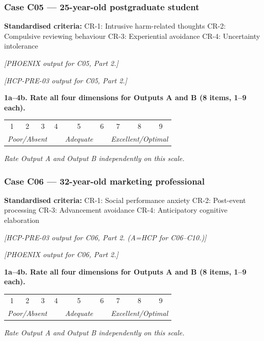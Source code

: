 \documentclass[11pt,a4paper]{article}
\makeatletter
\newcommand{\likertscale}[1]{%
\par\vspace{0.15em}%
\noindent\begin{tcolorbox}[colback=ScaleBG,colframe=BorderGrey,boxrule=0.4pt,arc=1mm,left=5pt,right=5pt,top=4pt,bottom=4pt]%
\small\textbf{\color{SlateMid}#1}\\[0.25em]%
\begin{tabular}{@{}*{9}{c}@{}}%
1 & 2 & 3 & 4 & 5 & 6 & 7 & 8 & 9 \\%
\multicolumn{3}{l}{\tiny\itshape Poor/Absent} & & \multicolumn{1}{c}{\tiny\itshape Adequate} & & \multicolumn{3}{r}{\tiny\itshape Excellent/Optimal}%
\end{tabular}%
\quad\textit{Rate Output A and Output B independently on this scale.}%
\end{tcolorbox}\vspace{0.1em}}
\makeatother
\begin{document}
\subsubsection*{Case C05 --- 25-year-old postgraduate student}
\begin{vignettebox}
\small\textbf{Standardised criteria:} CR-1: Intrusive harm-related thoughts \quad CR-2: Compulsive reviewing behaviour \quad CR-3: Experiential avoidance \quad CR-4: Uncertainty intolerance
\end{vignettebox}
\begin{outputAbox}\small\textit{[PHOENIX output for C05, Part 2.]}\end{outputAbox}
\begin{outputBbox}\small\textit{[HCP-PRE-03 output for C05, Part 2.]}\end{outputBbox}
\begin{ratingbox}
\likertscale{1a--4b. Rate all four dimensions for Outputs A and B (8 items, 1--9 each).}
\end{ratingbox}

\vspace{0.4em}

\subsubsection*{Case C06 --- 32-year-old marketing professional}
\begin{vignettebox}
\small\textbf{Standardised criteria:} CR-1: Social performance anxiety \quad CR-2: Post-event processing \quad CR-3: Advancement avoidance \quad CR-4: Anticipatory cognitive elaboration
\end{vignettebox}
\begin{outputAbox}\small\textit{[HCP-PRE-03 output for C06, Part 2. (A=HCP for C06--C10.)]}\end{outputAbox}
\begin{outputBbox}\small\textit{[PHOENIX output for C06, Part 2.]}\end{outputBbox}
\begin{ratingbox}
\likertscale{1a--4b. Rate all four dimensions for Outputs A and B (8 items, 1--9 each).}
\end{ratingbox}

\vspace{0.4em}
\end{document}
